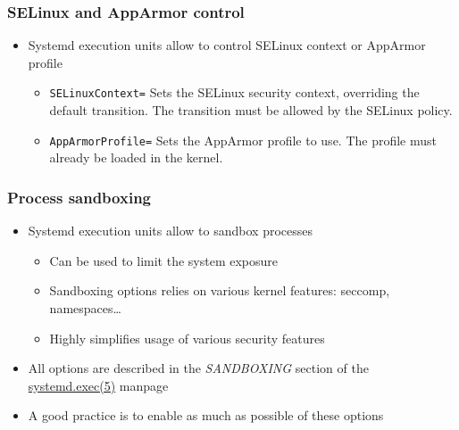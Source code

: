 \begin{frame}
	\frametitle{SELinux and AppArmor control}
	\begin{itemize}
		\item Systemd execution units allow to control SELinux context or AppArmor
			profile
			\begin{itemize}
				\item \texttt{SELinuxContext=} Sets the SELinux security context,
					overriding the default transition. The transition must be allowed by
					the SELinux policy.
				\item \texttt{AppArmorProfile=} Sets the AppArmor profile to use. The
					profile must already be loaded in the kernel.
			\end{itemize}
	\end{itemize}
\end{frame}

\begin{frame}
	\frametitle{Process sandboxing}
	\begin{itemize}
		\item Systemd execution units allow to sandbox processes
			\begin{itemize}
				\item Can be used to limit the system exposure
				\item Sandboxing options relies on various kernel features: seccomp,
					namespaces\ldots
				\item Highly simplifies usage of various security features
			\end{itemize}
		\item All options are described in the \emph{SANDBOXING} section of the
			\href{https://manned.org/systemd.exec.5}{systemd.exec(5)}
			manpage
		\item A good practice is to enable as much as possible of these options
	\end{itemize}
\end{frame}

